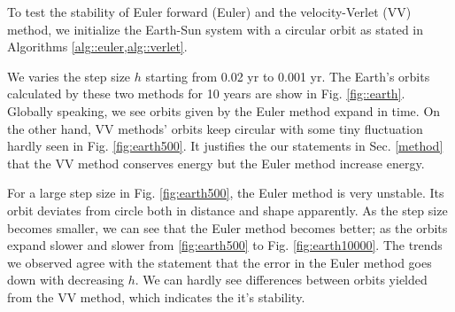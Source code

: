 To test the stability of Euler forward (Euler) and the velocity-Verlet (VV) method, we initialize the Earth-Sun system with a circular orbit as stated in Algorithms \ref{alg::euler,alg::verlet}.

We varies the step size $h$ starting from 0.02 yr to 0.001 yr.
The Earth's orbits calculated by these two methods for 10 years are show in Fig. \ref{fig::earth}. 
Globally speaking, we see orbits given by the Euler method expand in time.  
On the other hand, VV methods' orbits keep circular with some tiny fluctuation hardly seen in Fig. \ref{fig:earth500}.
It justifies the our statements in Sec. \ref{method} that the VV method conserves energy but the Euler method increase energy.

For a large step size in Fig. \ref{fig:earth500}, the Euler method is very unstable. Its orbit deviates from circle both in distance and shape apparently. 
As the step size becomes smaller, we can see that the Euler method becomes better; as the orbits expand slower and slower from \ref{fig:earth500} to Fig. \ref{fig:earth10000}.
 The trends we observed agree with the statement that the error in the Euler method goes down with decreasing $h$. We can hardly see differences between orbits yielded from the VV method, which indicates the it's stability.
 
